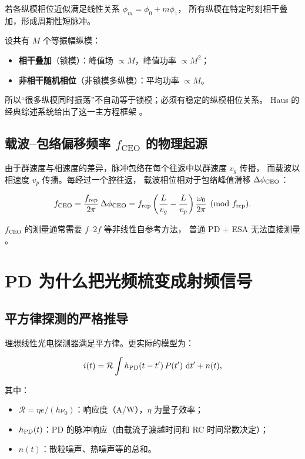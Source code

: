 \documentclass[11pt,a4paper]{article}
\newcommand{\rep}{f_{\text{rep}}}
\newcommand{\ceo}{f_{\text{CEO}}}
\newcommand{\pdresp}{\mathcal{R}}
\begin{document}
若各纵模相位近似满足线性关系 $\phi_m = \phi_0 + m\phi_1$，
所有纵模在特定时刻相干叠加，形成周期性短脉冲。

设共有 $M$ 个等振幅纵模：
\begin{itemize}
    \item \textbf{相干叠加}（锁模）：峰值场 $\propto M$，峰值功率 $\propto M^2$；
    \item \textbf{非相干随机相位}（非锁模多纵模）：平均功率 $\propto M$。
\end{itemize}

所以“很多纵模同时振荡”不自动等于锁模；必须有稳定的纵模相位关系。
Haus 的经典综述系统给出了这一主方程框架 \cite{Haus2000}。

\subsection{载波--包络偏移频率 $\ceo$ 的物理起源}

由于群速度与相速度的差异，脉冲包络在每个往返中以群速度 $v_g$ 传播，
而载波以相速度 $v_p$ 传播。每经过一个腔往返，
载波相位相对于包络峰值滑移 $\Delta\phi_{\rm CEO}$：

\begin{equation}\label{eq:ceo_physics}
\ceo = \frac{\rep}{2\pi}\,\Delta\phi_{\rm CEO}
= \rep\left(\frac{L}{v_g} - \frac{L}{v_p}\right)\frac{\omega_0}{2\pi} \pmod{\rep}.
\end{equation}

$\ceo$ 的测量通常需要 $f\text{--}2f$ 等非线性自参考方法，
普通 PD + ESA 无法直接测量 \cite{Cundiff2003,Newbury2005}。

\section{PD 为什么把光频梳变成射频信号}

\subsection{平方律探测的严格推导}

理想线性光电探测器满足平方律。更实际的模型为：

\begin{equation}\label{eq:pd_model}
i(t) = \pdresp \int h_{\rm PD}(t-t')\,P(t')\,\dd{t'} + n(t),
\end{equation}

其中：
\begin{itemize}
    \item $\pdresp = \eta e/(h\nu_0)$：响应度（A/W），$\eta$ 为量子效率；
    \item $h_{\rm PD}(t)$：PD 的脉冲响应（由载流子渡越时间和 RC 时间常数决定）；
    \item $n(t)$：散粒噪声、热噪声等的总和。
\end{itemize}
\end{document}

